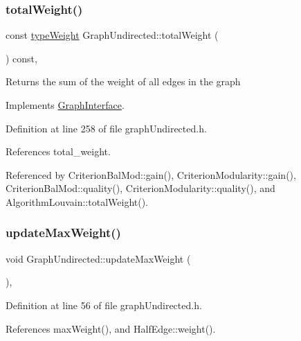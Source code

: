 \subsubsection{\texorpdfstring{total\+Weight()}{totalWeight()}}
{\footnotesize\ttfamily const \hyperlink{edge_8h_a2e7ea3be891ac8b52f749ec73fee6dd2}{type\+Weight} Graph\+Undirected\+::total\+Weight (\begin{DoxyParamCaption}{ }\end{DoxyParamCaption}) const\hspace{0.3cm}{\ttfamily [inline]}, {\ttfamily [virtual]}}

\begin{DoxyReturn}{Returns}
the sum of the weight of all edges in the graph 
\end{DoxyReturn}


Implements \hyperlink{classGraphInterface_a3bf10ae8e4fc3b049b5e7ac23798b89f}{Graph\+Interface}.



Definition at line 258 of file graph\+Undirected.\+h.



References total\+\_\+weight.



Referenced by Criterion\+Bal\+Mod\+::gain(), Criterion\+Modularity\+::gain(), Criterion\+Bal\+Mod\+::quality(), Criterion\+Modularity\+::quality(), and Algorithm\+Louvain\+::total\+Weight().

\mbox{\label{classGraphUndirected_a10582b249617c876bdf298f675285960}} 
\subsubsection{\texorpdfstring{update\+Max\+Weight()}{updateMaxWeight()}}
{\footnotesize\ttfamily void Graph\+Undirected\+::update\+Max\+Weight (\begin{DoxyParamCaption}{ }\end{DoxyParamCaption})\hspace{0.3cm}{\ttfamily [inline]}, {\ttfamily [private]}}



Definition at line 56 of file graph\+Undirected.\+h.



References max\+Weight(), and Half\+Edge\+::weight().



